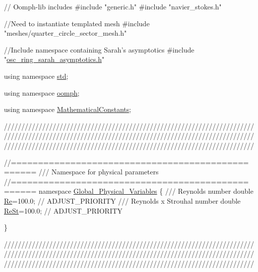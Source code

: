 \begin{DoxyCodeInclude}
\textcolor{comment}{// Oomph-lib includes}
\textcolor{preprocessor}{#include "generic.h"}
\textcolor{preprocessor}{#include "navier\_stokes.h"}


\textcolor{comment}{//Need to instantiate templated mesh}
\textcolor{preprocessor}{#include "meshes/quarter\_circle\_sector\_mesh.h"}

\textcolor{comment}{//Include namespace containing Sarah's asymptotics }
\textcolor{preprocessor}{#include "\hyperlink{osc__ring__sarah__asymptotics_8h}{osc\_ring\_sarah\_asymptotics.h}"}


\textcolor{keyword}{using namespace }\hyperlink{namespacestd}{std};

\textcolor{keyword}{using namespace }\hyperlink{namespaceoomph}{oomph};

\textcolor{keyword}{using namespace }\hyperlink{namespaceMathematicalConstants}{MathematicalConstants};

  
\textcolor{comment}{}
\textcolor{comment}{////////////////////////////////////////////////////////////////////////}
\textcolor{comment}{////////////////////////////////////////////////////////////////////////}
\textcolor{comment}{////////////////////////////////////////////////////////////////////////}
\textcolor{comment}{}  

\textcolor{comment}{//==================================================}\textcolor{comment}{}
\textcolor{comment}{/// Namespace for physical parameters}
\textcolor{comment}{}\textcolor{comment}{//==================================================}
\textcolor{keyword}{namespace }\hyperlink{namespaceGlobal__Physical__Variables}{Global\_Physical\_Variables}
\{
\textcolor{comment}{}
\textcolor{comment}{ /// Reynolds number}
\textcolor{comment}{} \textcolor{keywordtype}{double} \hyperlink{namespaceGlobal__Physical__Variables_ab814e627d2eb5bc50318879d19ab16b9}{Re}=100.0;  \textcolor{comment}{// ADJUST\_PRIORITY }
\textcolor{comment}{}
\textcolor{comment}{ /// Reynolds x Strouhal number}
\textcolor{comment}{} \textcolor{keywordtype}{double} \hyperlink{namespaceGlobal__Physical__Variables_a085ee4bf968ffdd01a41b8c41864f907}{ReSt}=100.0; \textcolor{comment}{// ADJUST\_PRIORITY }

\}



\textcolor{comment}{}
\textcolor{comment}{////////////////////////////////////////////////////////////////////////}
\textcolor{comment}{////////////////////////////////////////////////////////////////////////}
\textcolor{comment}{////////////////////////////////////////////////////////////////////////}
\textcolor{comment}{}


\end{DoxyCodeInclude}
